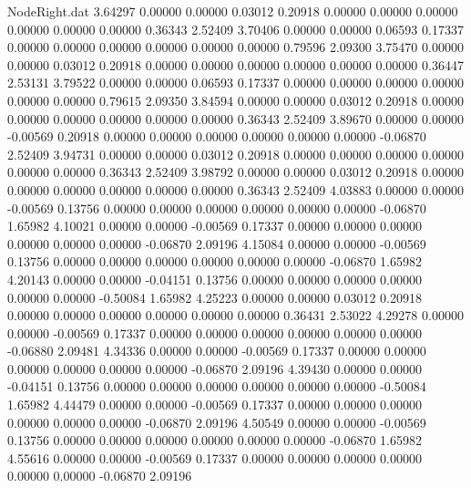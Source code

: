 \begin{filecontents}{NodeRight.dat}
   3.64297    0.00000    0.00000     0.03012    0.20918    0.00000    0.00000    0.00000    0.00000    0.00000    0.00000    0.36343    2.52409
   3.70406    0.00000    0.00000     0.06593    0.17337    0.00000    0.00000    0.00000    0.00000    0.00000    0.00000    0.79596    2.09300
   3.75470    0.00000    0.00000     0.03012    0.20918    0.00000    0.00000    0.00000    0.00000    0.00000    0.00000    0.36447    2.53131
   3.79522    0.00000    0.00000     0.06593    0.17337    0.00000    0.00000    0.00000    0.00000    0.00000    0.00000    0.79615    2.09350
   3.84594    0.00000    0.00000     0.03012    0.20918    0.00000    0.00000    0.00000    0.00000    0.00000    0.00000    0.36343    2.52409
   3.89670    0.00000    0.00000    -0.00569    0.20918    0.00000    0.00000    0.00000    0.00000    0.00000    0.00000   -0.06870    2.52409
   3.94731    0.00000    0.00000     0.03012    0.20918    0.00000    0.00000    0.00000    0.00000    0.00000    0.00000    0.36343    2.52409
   3.98792    0.00000    0.00000     0.03012    0.20918    0.00000    0.00000    0.00000    0.00000    0.00000    0.00000    0.36343    2.52409
   4.03883    0.00000    0.00000    -0.00569    0.13756    0.00000    0.00000    0.00000    0.00000    0.00000    0.00000   -0.06870    1.65982
   4.10021    0.00000    0.00000    -0.00569    0.17337    0.00000    0.00000    0.00000    0.00000    0.00000    0.00000   -0.06870    2.09196
   4.15084    0.00000    0.00000    -0.00569    0.13756    0.00000    0.00000    0.00000    0.00000    0.00000    0.00000   -0.06870    1.65982
   4.20143    0.00000    0.00000    -0.04151    0.13756    0.00000    0.00000    0.00000    0.00000    0.00000    0.00000   -0.50084    1.65982
   4.25223    0.00000    0.00000     0.03012    0.20918    0.00000    0.00000    0.00000    0.00000    0.00000    0.00000    0.36431    2.53022
   4.29278    0.00000    0.00000    -0.00569    0.17337    0.00000    0.00000    0.00000    0.00000    0.00000    0.00000   -0.06880    2.09481
   4.34336    0.00000    0.00000    -0.00569    0.17337    0.00000    0.00000    0.00000    0.00000    0.00000    0.00000   -0.06870    2.09196
   4.39430    0.00000    0.00000    -0.04151    0.13756    0.00000    0.00000    0.00000    0.00000    0.00000    0.00000   -0.50084    1.65982
   4.44479    0.00000    0.00000    -0.00569    0.17337    0.00000    0.00000    0.00000    0.00000    0.00000    0.00000   -0.06870    2.09196
   4.50549    0.00000    0.00000    -0.00569    0.13756    0.00000    0.00000    0.00000    0.00000    0.00000    0.00000   -0.06870    1.65982
   4.55616    0.00000    0.00000    -0.00569    0.17337    0.00000    0.00000    0.00000    0.00000    0.00000    0.00000   -0.06870    2.09196

\end{filecontents}
